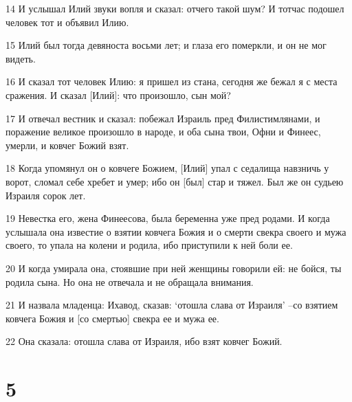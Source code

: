 \par 14 И услышал Илий звуки вопля и сказал: отчего такой шум? И тотчас подошел человек тот и объявил Илию.
\par 15 Илий был тогда девяноста восьми лет; и глаза его померкли, и он не мог видеть.
\par 16 И сказал тот человек Илию: я пришел из стана, сегодня же бежал я с места сражения. И сказал [Илий]: что произошло, сын мой?
\par 17 И отвечал вестник и сказал: побежал Израиль пред Филистимлянами, и поражение великое произошло в народе, и оба сына твои, Офни и Финеес, умерли, и ковчег Божий взят.
\par 18 Когда упомянул он о ковчеге Божием, [Илий] упал с седалища навзничь у ворот, сломал себе хребет и умер; ибо он [был] стар и тяжел. Был же он судьею Израиля сорок лет.
\par 19 Невестка его, жена Финеесова, была беременна уже пред родами. И когда услышала она известие о взятии ковчега Божия и о смерти свекра своего и мужа своего, то упала на колени и родила, ибо приступили к ней боли ее.
\par 20 И когда умирала она, стоявшие при ней женщины говорили ей: не бойся, ты родила сына. Но она не отвечала и не обращала внимания.
\par 21 И назвала младенца: Ихавод, сказав: `отошла слава от Израиля' --со взятием ковчега Божия и [со смертью] свекра ее и мужа ее.
\par 22 Она сказала: отошла слава от Израиля, ибо взят ковчег Божий.

\chapter{5}

